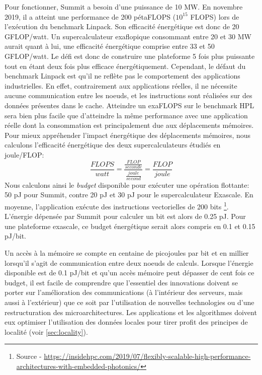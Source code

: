     
            Pour fonctionner, Summit a besoin d'une puissance de 10 MW. En novembre 2019, il a atteint une performance de 200 pétaFLOPS ($10^{15}$ \gls{FLOPS}) lors de l'exécution du benchmark Linpack. Son efficacité énergétique est donc de 20 GFLOP/watt. Un supercalculateur exaflopique consommant entre 20 et 30 MW aurait quant à lui, une efficacité énergétique comprise entre 33 et 50 GFLOP/watt. Le défi est donc de construire une plateforme 5 fois plus puissante tout en étant deux fois plus efficace énergétiquement. Cependant, le défaut du benchmark Linpack est qu'il ne reflète pas le comportement des applications industrielles. En effet, contrairement aux applications réelles, il ne nécessite aucune communication entre les noeuds, et les instructions sont réalisées sur des données présentes dans le cache. Atteindre un exaFLOPS sur le benchmark HPL sera bien plus facile que d'atteindre la même performance avec une application réelle dont la consommation est principalement due aux déplacements mémoires. Pour mieux appréhender l'impact énergétique des déplacements mémoires, nous calculons l'efficacité énergétique des deux supercalculateurs étudiés en joule/FLOP:
            \begin{equation}
                 \frac{FLOPS}{watt}  =  \frac{\frac{FLOP}{seconde}}  { \frac{joule}{second}} =  \frac{FLOP}{joule}
            \end{equation}
            Nous calculons ainsi le \textit{budget} disponible pour exécuter une opération flottante: 50 pJ pour Summit, contre 20 pJ et 30 pJ pour le supercalculateur Exascale. En moyenne, l'application exécute des instructions vectorielles de 200 bits \footnote{Source - \url{https://insidehpc.com/2019/07/flexibly-scalable-high-performance-architectures-with-embedded-photonics/}}. L'énergie dépensée par Summit pour calculer un bit est alors de 0.25 pJ. Pour une plateforme exascale, ce budget énergétique serait alors compris en 0.1 et 0.15 pJ/bit.
            
            Un accès à la mémoire se compte en centaine de picojoules par bit et en millier lorsqu'il s'agit de communication entre deux noeuds de calculs. Lorsque l'énergie disponible est de 0.1 pJ/bit et qu'un accès mémoire peut dépasser de cent fois ce budget, il est facile de comprendre que l'essentiel des innovations doivent se porter sur l'amélioration des communications (à l'intérieur des serveurs, mais aussi à l'extérieur) que ce soit par l'utilisation de nouvelles technologies ou d'une restructuration des microarchitectures. Les applications et les algorithmes doivent eux optimiser l'utilisation des données locales pour tirer profit des principes de localité (voir \autoref{sec:locality}).


